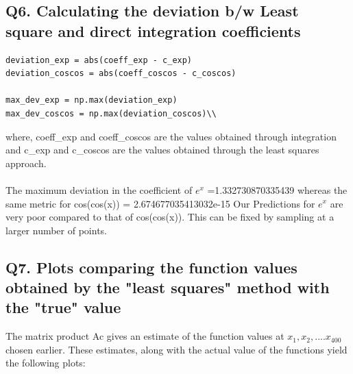 \documentclass{article}
\begin{document}
\clearpage
\subsection*{Q6. Calculating the deviation b/w Least square and direct integration coefficients}

\begin{lstlisting}
deviation_exp = abs(coeff_exp - c_exp)
deviation_coscos = abs(coeff_coscos - c_coscos)

max_dev_exp = np.max(deviation_exp)
max_dev_coscos = np.max(deviation_coscos)\\
\end{lstlisting}
where, coeff\_exp and coeff\_coscos are the values obtained through
integration and c\_exp and c\_coscos are the values obtained through the least
squares approach.\\
\\The maximum deviation in the coefficient of $e^x$ =1.332730870335439\newline
whereas the same metric for cos(cos(x)) = 2.674677035413032e-15\newline
Our Predictions for $e^x$ are very poor compared to that of cos(cos(x)). This can be fixed by sampling at a larger number of points.\newline 


\subsection*{Q7. Plots comparing the function values obtained by the "least squares" method with the "true" value}
The matrix product Ac gives an estimate of the function values at ${x_{1}, x_{2}, .... x_{400}}$ chosen
earlier. These estimates, along with the actual value of the functions yield
the following plots:
\end{document}
